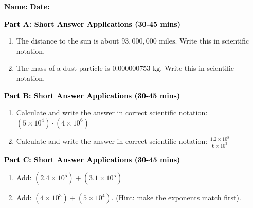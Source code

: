 \documentclass[12pt, letterpaper, fleqn]{article}
\begin{document}
\textbf{Name:} \underline{\hspace{5cm}}
\hfill
\textbf{Date:} \underline{\hspace{3cm}}\\


\begin{tcolorbox}[colback=customteal!20]
\large\textcolor{black}{\textbf{Part A: Short Answer Applications (30-45 mins)}}
\end{tcolorbox}

\vspace{3mm}

\begin{enumerate}[itemsep=4.2cm, leftmargin=0.6cm]
\item The distance to the sun is about $93,000,000\text{ miles}$. Write this in scientific notation.
\item The mass of a dust particle is $0.000000753\text{ kg}$. Write this in scientific notation.
\end{enumerate}

\newpage

\begin{tcolorbox}[colback=customteal!20]
\large\textcolor{black}{\textbf{Part B: Short Answer Applications (30-45 mins)}}
\end{tcolorbox}

\vspace{3mm}

\begin{enumerate}[itemsep=4.2cm, leftmargin=0.6cm, resume]
\item Calculate and write the answer in correct scientific notation: $(5 \times 10^4) \cdot (4 \times 10^6)$
\item Calculate and write the answer in correct scientific notation: $\frac{1.2 \times 10^8}{6 \times 10^3}$
\end{enumerate}

\newpage

\begin{tcolorbox}[colback=customteal!20]
\large\textcolor{black}{\textbf{Part C: Short Answer Applications (30-45 mins)}}
\end{tcolorbox}

\vspace{3mm}

\begin{enumerate}[itemsep=4.2cm, leftmargin=0.6cm, resume]
\item Add: $(2.4 \times 10^5) + (3.1 \times 10^5)$
\item Add: $(4 \times 10^3) + (5 \times 10^4)$. (Hint: make the exponents match first).
\end{enumerate}
\end{document}
